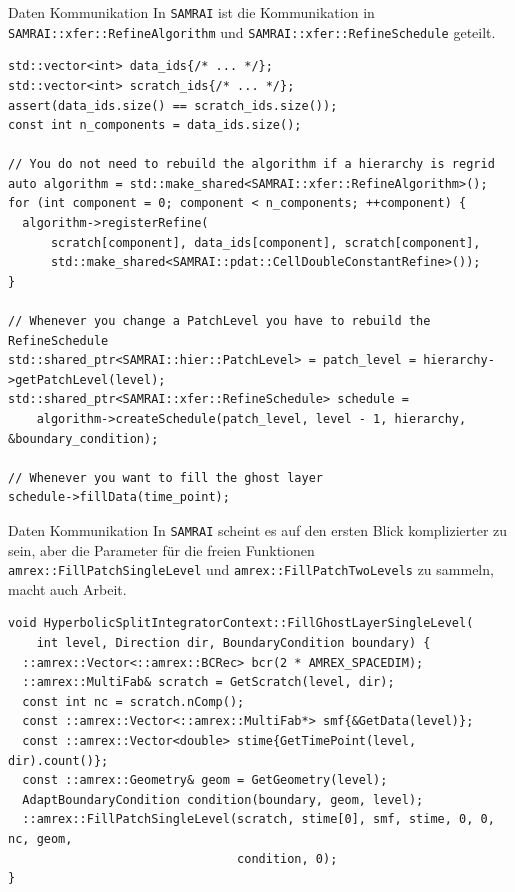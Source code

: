 \documentclass[ucs,9pt]{beamer}
\begin{document}
\begin{frame}[fragile]{Daten Kommunikation}
In \texttt{SAMRAI} ist die Kommunikation in \texttt{SAMRAI::xfer::RefineAlgorithm} und \texttt{SAMRAI::xfer::RefineSchedule} geteilt.
\begin{lstlisting}
std::vector<int> data_ids{/* ... */};
std::vector<int> scratch_ids{/* ... */};
assert(data_ids.size() == scratch_ids.size());
const int n_components = data_ids.size();

// You do not need to rebuild the algorithm if a hierarchy is regrid
auto algorithm = std::make_shared<SAMRAI::xfer::RefineAlgorithm>();
for (int component = 0; component < n_components; ++component) {
  algorithm->registerRefine(
      scratch[component], data_ids[component], scratch[component],
      std::make_shared<SAMRAI::pdat::CellDoubleConstantRefine>());
}

// Whenever you change a PatchLevel you have to rebuild the RefineSchedule
std::shared_ptr<SAMRAI::hier::PatchLevel> = patch_level = hierarchy->getPatchLevel(level);
std::shared_ptr<SAMRAI::xfer::RefineSchedule> schedule =  
	algorithm->createSchedule(patch_level, level - 1, hierarchy, &boundary_condition);

// Whenever you want to fill the ghost layer
schedule->fillData(time_point);
\end{lstlisting}
\end{frame}

\begin{frame}[fragile]{Daten Kommunikation}
In \texttt{SAMRAI} scheint es auf den ersten Blick komplizierter zu sein, aber die Parameter für die freien Funktionen
\texttt{amrex::FillPatchSingleLevel} und \texttt{amrex::FillPatchTwoLevels} zu sammeln, macht auch Arbeit.
\begin{lstlisting}
void HyperbolicSplitIntegratorContext::FillGhostLayerSingleLevel(
    int level, Direction dir, BoundaryCondition boundary) {
  ::amrex::Vector<::amrex::BCRec> bcr(2 * AMREX_SPACEDIM);
  ::amrex::MultiFab& scratch = GetScratch(level, dir);
  const int nc = scratch.nComp();
  const ::amrex::Vector<::amrex::MultiFab*> smf{&GetData(level)};
  const ::amrex::Vector<double> stime{GetTimePoint(level, dir).count()};
  const ::amrex::Geometry& geom = GetGeometry(level);
  AdaptBoundaryCondition condition(boundary, geom, level);
  ::amrex::FillPatchSingleLevel(scratch, stime[0], smf, stime, 0, 0, nc, geom,
                                condition, 0);
}
\end{lstlisting}
\end{frame}
\end{document}
